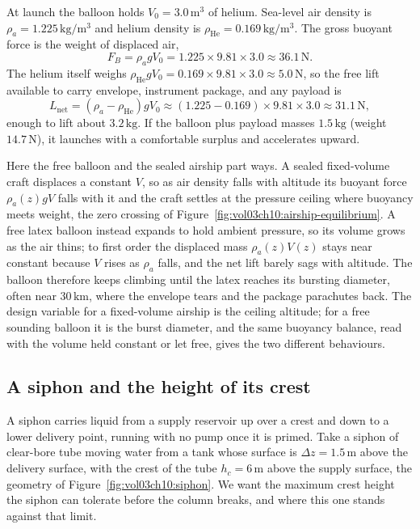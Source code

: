 At launch the balloon holds $V_0 = 3.0\,\text{m}^3$ of helium. Sea-level
air density is $\rho_a = 1.225\,\si{\kilogram\per\meter\cubed}$ and helium
density is $\rho_{\text{He}} = 0.169\,\si{\kilogram\per\meter\cubed}$. The
gross buoyant force is the weight of displaced air,
\[
F_B = \rho_a g V_0 = 1.225 \times 9.81 \times 3.0 \approx 36.1\,\text{N}.
\]
The helium itself weighs $\rho_{\text{He}} g V_0 = 0.169 \times 9.81
\times 3.0 \approx 5.0\,\text{N}$, so the free lift available to carry
envelope, instrument package, and any payload is
\[
L_{\text{net}} = (\rho_a - \rho_{\text{He}}) g V_0
\approx (1.225 - 0.169) \times 9.81 \times 3.0 \approx 31.1\,\text{N},
\]
enough to lift about $3.2\,\si{\kilogram}$. If the balloon plus payload
masses $1.5\,\si{\kilogram}$ (weight $14.7\,\text{N}$), it launches with a
comfortable surplus and accelerates upward.

Here the free balloon and the sealed airship part ways. A sealed
fixed-volume craft displaces a constant $V$, so as air density falls with
altitude its buoyant force $\rho_a(z) g V$ falls with it and the craft
settles at the pressure ceiling where buoyancy meets weight, the zero
crossing of Figure~\ref{fig:vol03ch10:airship-equilibrium}. A free latex
balloon instead expands to hold ambient pressure, so its volume grows as
the air thins; to first order the displaced mass $\rho_a(z) V(z)$ stays
near constant because $V$ rises as $\rho_a$ falls, and the net lift barely
sags with altitude. The balloon therefore keeps climbing until the latex
reaches its bursting diameter, often near $30\,\si{\kilo\meter}$, where the
envelope tears and the package parachutes back. The design variable for a
fixed-volume airship is the ceiling altitude; for a free sounding balloon
it is the burst diameter, and the same buoyancy balance, read with the
volume held constant or let free, gives the two different behaviours.



\subsection{A siphon and the height of its crest}

A siphon carries liquid from a supply reservoir up over a crest and down to
a lower delivery point, running with no pump once it is primed. Take a
siphon of clear-bore tube moving water from a tank whose surface is
$\Delta z = 1.5\,\si{\meter}$ above the delivery surface, with the crest of
the tube $h_c = 6\,\si{\meter}$ above the supply surface, the geometry of
Figure~\ref{fig:vol03ch10:siphon}. We want the maximum crest height the
siphon can tolerate before the column breaks, and where this one stands
against that limit.

